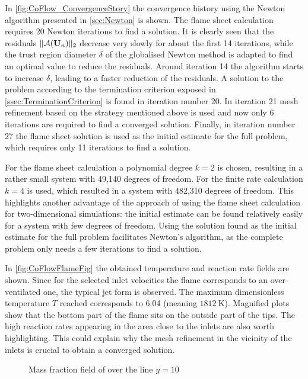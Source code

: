 In \cref{fig:CoFlow_ConvergenceStory} the convergence history using the Newton algorithm presented in \cref{sec:Newton} is shown. The flame sheet calculation requires 20 Newton iterations to find a solution. It is clearly seen that the residuals $\| \mathcal{A}(\textbf{U}_{n}) \|_2 $  decrease very slowly for about the first 14 iterations, while the trust region diameter $\delta$ of the globalised Newton method is adapted to find an optimal value to reduce the residuals. Around iteration 14 the algorithm starts to increase $\delta$, leading to a faster reduction of the residuals. A solution to the problem according to the termination criterion exposed in \cref{ssec:TerminationCriterion} is found in iteration number 20. In iteration 21 mesh refinement based on the strategy mentioned above is used and now only 6 iterations are required to find a converged solution. Finally, in iteration number 27 the flame sheet solution is used as the initial estimate for the full problem, which requires only 11 iterations to find a solution.  

For the flame sheet calculation a polynomial degree $k = 2$ is chosen, resulting in a rather small system with 49,140 degrees of freedom. For the finite rate calculation $k = 4$ is used, which resulted in a system with 482,310 degrees of freedom.  This highlights another advantage of the approach of using the flame sheet calculation for two-dimensional simulations: the initial estimate can be found relatively easily for a system with few degrees of freedom. Using the solution found as the initial estimate for the full problem facilitates Newton's algorithm, as the complete problem only needs a few iterations to find a solution.

In \cref{fig:CoFlowFlameFig} the obtained temperature and reaction rate fields are shown. Since for the selected inlet velocities the flame corresponds to an over-ventilated one, the typical jet form is observed. The maximum dimensionless temperature $T$  reached corresponds to 6.04 (meaning $\SI{1812}{\kelvin}$). Magnified plots show that the bottom part of the flame sits on the outside part of the tips. The high reaction rates appearing in the area close to the inlets are also worth highlighting. This could explain why the mesh refinement in the vicinity of the inlets is crucial to obtain a converged solution. 

\begin{figure}[h]
	\centering
	\pgfplotsset{width=0.6\textwidth, compat=1.3}
		\caption{Mass fraction field of   over the line $y = 10$}
		\label{fig:CoFlowMF3_infiniteFinite}
	\end{figure}


